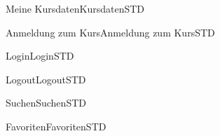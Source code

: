 \ifttm

\begin{MXContent}{Meine Kursdaten}{Kursdaten}{STD}
\MGlobalDataTag
{}
\end{MXContent}

\begin{MXContent}{Anmeldung zum Kurs}{Anmeldung zum Kurs}{STD}
\MGlobalConfTag
{}
\end{MXContent}

\begin{MXContent}{Login}{Login}{STD}
\MGlobalLoginTag
{}
\end{MXContent}

\begin{MXContent}{Logout}{Logout}{STD}
\MGlobalLogoutTag
{}
\end{MXContent}

\begin{MXContent}{Suchen}{Suchen}{STD}
\MGlobalSearchTag
\end{MXContent}

\begin{MXContent}{Favoriten}{Favoriten}{STD}
\MGlobalFavoTag
{}
\end{MXContent}

\fi
